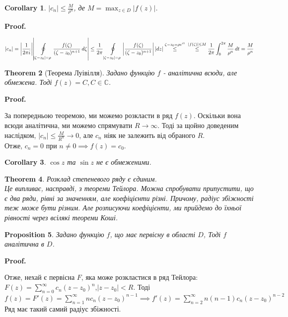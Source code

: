 \documentclass[a4paper, 10pt]{article}
\makeatletter
\def\qed{$\blacksquare$}
\theoremstyle{theoremdd}
\newtheorem{theorem}{Theorem}[subsection]
\theoremstyle{theoremdd}
\theoremstyle{theoremdd}
\theoremstyle{theoremdd}
\theoremstyle{theoremdd}
\newtheorem{proposition}[theorem]{Proposition}
\theoremstyle{theoremdd}
\theoremstyle{theoremdd}
\theoremstyle{theoremdd}
\newtheorem{corollary}[theorem]{Corollary}
\renewenvironment{proof}[1][Proof.\\]{\par
\pushQED{\hfill \qed}%
\normalfont \topsep6\p@\@plus6\p@\relax
\trivlist
\item\relax
{\bfseries
#1\@addpunct{.}}\hspace\labelsep\ignorespaces
}{%
\popQED\endtrivlist\@endpefalse
}
\makeatother
\begin{document}
\begin{corollary}
$\displaystyle |c_n| \leq \frac{M}{\rho^n}$, де $\displaystyle M=\max_{z\in D} |f(z)|$.
\end{corollary}

\begin{proof}
	 $\displaystyle |c_n| = \abs{\frac{1}{2\pi i}} \abs{\oint\displaylimits_{|\zeta-z_0|=\rho} \frac{f(\zeta)}{(\zeta-z_0)^{n+1}}\,d\zeta} \leq \frac{1}{2\pi} \oint\displaylimits_{|\zeta-z_0|=\rho} \abs{\frac{f(\zeta)}{(\zeta-z_0)^{n+1}}}\,\abs{dz} \overset{\zeta-z_0= \rho e^{it}}{\leq} \\ \overset{|f(\zeta)| \leq M}{\leq} \frac{1}{2\pi} \int_{0}^{2 \pi} \frac{M}{\rho^n}\,dt = \frac{M}{\rho^n}$
\end{proof}

\begin{theorem}[Теорема Луівілля]
Задано функцію $f$ - аналітична всюди, але обмежена. Тоді $f(z)=C, C \in \mathbb{C}$.
\end{theorem}

\begin{proof}
За попередньою теоремою, ми можемо розкласти в ряд $f(z)$. Оскільки вона всюди аналітична, ми можемо спрямувати $R \to \infty$. Тоді за щойно доведеним наслідком, $\displaystyle |c_n| \leq \frac{M}{R^n} \rightarrow 0$, але $c_n$ ніяк не залежить від обраного $R$.\\
Отже, $c_n=0$ при $n \neq 0 \implies f(z)=c_0$.
\end{proof}

\begin{corollary}
$\cos z$ та $\sin z$ не є обмеженими.
\end{corollary}

\begin{theorem}
Розклад степеневого ряду є єдиним.\\
\textit{Це випливає, насправді, з теореми Тейлора. Можна спробувати припустити, що є два ряди, рівні за значенням, але коефіцієнти різні. Причому, радіус збіжності теж може бути різним. Але розписуючи коефіцієнти, ми прийдемо до їхньої рівності через всілякі теореми Коші.}
\end{theorem}

\begin{proposition}
Задано функцію $f$, що має первісну в області $D$, Тоді $f$ аналітична в $D$.
\end{proposition}

\begin{proof}
Отже, нехай є первісна $F$, яка може розкластися в ряд Тейлора:\\
$\displaystyle F(z)=\sum_{n=0}^{\infty} c_n(z-z_0)^n$,$|z-z_0|<R$. Тоді\\ $\displaystyle f(z)=F'(z)=\sum_{n=1}^{\infty} nc_n(z-z_0)^{n-1} \implies f'(z) = \sum_{n=2}^{\infty} n(n-1)c_n(z-z_0)^{n-2}$\\
Ряд має такий самий радіус збіжності.
\end{proof}
\end{document}
